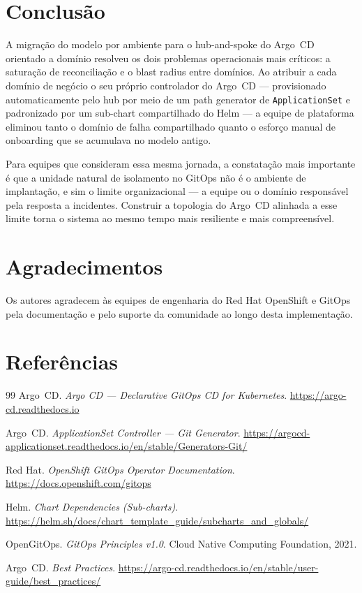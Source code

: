 \documentclass[11pt,a4paper]{article}
\begin{document}
\section{Conclusão}
\label{sec:conclusion}

A migração do modelo por ambiente para o hub-and-spoke do Argo~CD orientado a domínio
resolveu os dois problemas operacionais mais críticos: a saturação de reconciliação e o
blast radius entre domínios.
Ao atribuir a cada domínio de negócio o seu próprio controlador do Argo~CD ---
provisionado automaticamente pelo hub por meio de um path generator de
\texttt{ApplicationSet} e padronizado por um sub-chart compartilhado do Helm --- a
equipe de plataforma eliminou tanto o domínio de falha compartilhado quanto o esforço
manual de onboarding que se acumulava no modelo antigo.

Para equipes que consideram essa mesma jornada, a constatação mais importante é que a
unidade natural de isolamento no GitOps não é o ambiente de implantação, e sim o limite
organizacional --- a equipe ou o domínio responsável pela resposta a incidentes.
Construir a topologia do Argo~CD alinhada a esse limite torna o sistema ao mesmo tempo
mais resiliente e mais compreensível.

\section*{Agradecimentos}

Os autores agradecem às equipes de engenharia do Red Hat OpenShift e GitOps pela
documentação e pelo suporte da comunidade ao longo desta implementação.

\section*{Referências}

\begin{thebibliography}{99}
  Argo~CD. \textit{Argo CD --- Declarative GitOps CD for Kubernetes}.
  \url{https://argo-cd.readthedocs.io}

  Argo~CD. \textit{ApplicationSet Controller --- Git Generator}.
  \url{https://argocd-applicationset.readthedocs.io/en/stable/Generators-Git/}

  Red Hat. \textit{OpenShift GitOps Operator Documentation}.
  \url{https://docs.openshift.com/gitops}

  Helm. \textit{Chart Dependencies (Sub-charts)}.
  \url{https://helm.sh/docs/chart_template_guide/subcharts_and_globals/}

  OpenGitOps. \textit{GitOps Principles v1.0}.
  Cloud Native Computing Foundation, 2021.

  Argo~CD. \textit{Best Practices}.
  \url{https://argo-cd.readthedocs.io/en/stable/user-guide/best_practices/}
\end{thebibliography}
\end{document}
